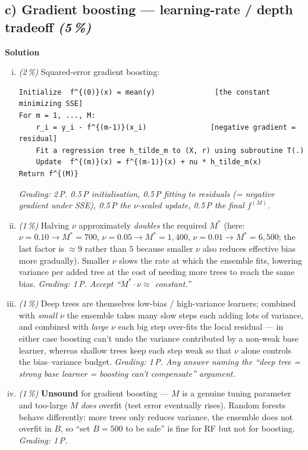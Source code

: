 \documentclass[11pt,a4paper]{article}
\newcommand{\subpoints}[1]{\textit{(#1\,\%)}}
\newcommand{\sol}{\noindent\textbf{Solution}}
\begin{document}
\subsection*{c) Gradient boosting --- learning-rate / depth tradeoff \subpoints{5}}
\sol{}
\begin{enumerate}[(i)]
  \item \subpoints{2} Squared-error gradient boosting:
\begin{verbatim}
Initialize  f^{(0)}(x) = mean(y)              [the constant minimizing SSE]
For m = 1, ..., M:
    r_i = y_i - f^{(m-1)}(x_i)               [negative gradient = residual]
    Fit a regression tree h_tilde_m to (X, r) using subroutine T(.)
    Update  f^{(m)}(x) = f^{(m-1)}(x) + nu * h_tilde_m(x)
Return f^{(M)}
\end{verbatim}
        \emph{Grading: 2\,P. 0.5\,P initialisation, 0.5\,P fitting to residuals (= negative
        gradient under SSE), 0.5\,P the $\nu$-scaled update, 0.5\,P the final $f^{(M)}$.}

  \item \subpoints{1} Halving $\nu$ approximately \emph{doubles} the required $M^*$ (here:
        $\nu = 0.10 \to M^* = 700$, $\nu = 0.05 \to M^* = 1{,}400$, $\nu = 0.01 \to M^* = 6{,}500$;
        the last factor is $\approx 9$ rather than $5$ because smaller $\nu$ also reduces effective
        bias more gradually). Smaller $\nu$ slows the rate at which the ensemble fits, lowering
        variance per added tree at the cost of needing more trees to reach the same bias.
        \emph{Grading: 1\,P. Accept ``$M^* \cdot \nu \approx$ constant.''}

  \item \subpoints{1} Deep trees are themselves low-bias / high-variance learners; combined
        with \emph{small} $\nu$ the ensemble takes many slow steps each adding lots of variance,
        and combined with \emph{large} $\nu$ each big step over-fits the local residual --- in
        either case boosting can't undo the variance contributed by a non-weak base learner,
        whereas shallow trees keep each step weak so that $\nu$ alone controls the bias--variance
        budget.
        \emph{Grading: 1\,P. Any answer naming the ``deep tree = strong base learner =
        boosting can't compensate'' argument.}

  \item \subpoints{1} \textbf{Unsound} for gradient boosting --- $M$ is a genuine tuning
        parameter and too-large $M$ \emph{does} overfit (test error eventually rises). Random
        forests behave differently: more trees only reduces variance, the ensemble does not
        overfit in $B$, so ``set $B = 500$ to be safe'' is fine for RF but not for boosting.
        \emph{Grading: 1\,P.}
\end{enumerate}
\end{document}

